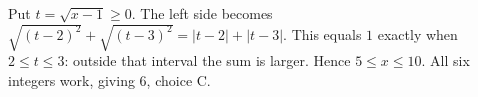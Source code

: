 Put $t=\sqrt{x-1}\ge 0$. The left side becomes $\sqrt{(t-2)^2}+\sqrt{(t-3)^2}=|t-2|+|t-3|$. This equals $1$ exactly when $2\le t\le 3$: outside that interval the sum is larger. Hence $5\le x\le 10$. All six integers work, giving $\boxed{6}$, choice C.
